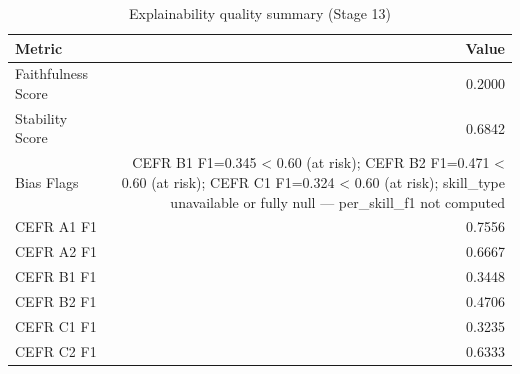 \begin{table}[htbp]
\centering
\caption{Explainability quality summary (Stage 13)}
\label{tab:explainability_summary}
\begin{tabular}{lr}
\toprule
Metric & Value \\
\midrule
Faithfulness Score & 0.2000 \\
Stability Score & 0.6842 \\
Bias Flags & CEFR B1 F1=0.345 < 0.60 (at risk); CEFR B2 F1=0.471 < 0.60 (at risk); CEFR C1 F1=0.324 < 0.60 (at risk); skill\_type unavailable or fully null — per\_skill\_f1 not computed \\
CEFR A1 F1 & 0.7556 \\
CEFR A2 F1 & 0.6667 \\
CEFR B1 F1 & 0.3448 \\
CEFR B2 F1 & 0.4706 \\
CEFR C1 F1 & 0.3235 \\
CEFR C2 F1 & 0.6333 \\
\bottomrule
\end{tabular}
\end{table}
